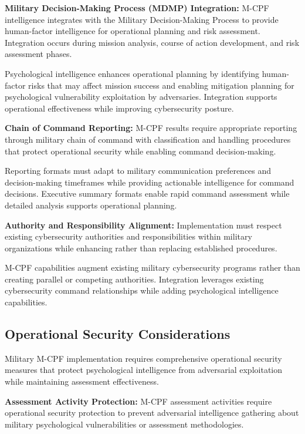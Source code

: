 \documentclass[10pt, twocolumn]{article}
\begin{document}
\textbf{Military Decision-Making Process (MDMP) Integration:} M-CPF intelligence integrates with the Military Decision-Making Process to provide human-factor intelligence for operational planning and risk assessment. Integration occurs during mission analysis, course of action development, and risk assessment phases.

Psychological intelligence enhances operational planning by identifying human-factor risks that may affect mission success and enabling mitigation planning for psychological vulnerability exploitation by adversaries. Integration supports operational effectiveness while improving cybersecurity posture.

\textbf{Chain of Command Reporting:} M-CPF results require appropriate reporting through military chain of command with classification and handling procedures that protect operational security while enabling command decision-making.

Reporting formats must adapt to military communication preferences and decision-making timeframes while providing actionable intelligence for command decisions. Executive summary formats enable rapid command assessment while detailed analysis supports operational planning.

\textbf{Authority and Responsibility Alignment:} Implementation must respect existing cybersecurity authorities and responsibilities within military organizations while enhancing rather than replacing established procedures.

M-CPF capabilities augment existing military cybersecurity programs rather than creating parallel or competing authorities. Integration leverages existing cybersecurity command relationships while adding psychological intelligence capabilities.

\subsection{Operational Security Considerations}

Military M-CPF implementation requires comprehensive operational security measures that protect psychological intelligence from adversarial exploitation while maintaining assessment effectiveness.

\textbf{Assessment Activity Protection:} M-CPF assessment activities require operational security protection to prevent adversarial intelligence gathering about military psychological vulnerabilities or assessment methodologies.
\end{document}
